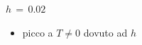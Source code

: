 \begin{frame}
\begin{columns}
\begin{column}{0.5\textwidth}
\begin{block}{$h\,=\,0.02$}
                \vspace{0.5cm}
                \begin{itemize}[itemsep=0.5em, label=$\diamond$]
                    \item picco a $T \neq 0$ dovuto ad $h$
                \end{itemize}
            
            \end{block}
        \end{column}
    \end{columns}

\end{frame}



